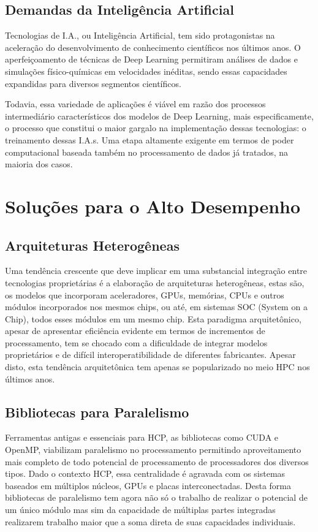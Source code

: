 \documentclass{article}
\begin{document}
\subsection*{Demandas da Inteligência Artificial}
Tecnologias de I.A., ou Inteligência Artificial, tem sido protagonistas na aceleração do desenvolvimento de conhecimento científicos nos últimos anos. O aperfeiçoamento de técnicas de Deep Learning permitiram análises de dados e simulações físico-químicas em velocidades inéditas, sendo essas capacidades expandidas para diversos segmentos científicos.

Todavia, essa variedade de aplicações é viável em razão dos processos intermediário característicos dos modelos de Deep Learning, mais especificamente, o processo que constitui o maior gargalo na implementação dessas tecnologias: o treinamento dessas I.A.s. Uma etapa altamente exigente em termos de poder computacional baseada também no processamento de dados já tratados, na maioria dos casos. 

\section*{Soluções para o Alto Desempenho}
\subsection*{Arquiteturas Heterogêneas}
Uma tendência crescente que deve implicar em uma substancial integração entre tecnologias proprietárias é a elaboração de arquiteturas heterogêneas, estas são, os modelos que incorporam aceleradores, GPUs, memórias, CPUs e outros módulos incorporados nos mesmos chips, ou até, em sistemas SOC (System on a Chip), todos esses módulos em um mesmo chip. Esta paradigma arquitetônico, apesar de apresentar eficiência evidente em termos de incrementos de processamento, tem se chocado com a dificuldade de integrar modelos proprietários e de difícil interoperatibilidade de diferentes fabricantes. Apesar disto, esta tendência arquitetônica tem apenas se popularizado no meio HPC nos últimos anos.
\subsection*{Bibliotecas para Paralelismo}
Ferramentas antigas e essenciais para HCP, as bibliotecas como CUDA e OpenMP, viabilizam paralelismo no processamento permitindo aproveitamento mais completo de todo potencial de processamento de processadores dos diversos tipos. Dado o contexto HCP, essa centralidade é agravada com os sistemas baseados em múltiplos núcleos, GPUs e placas interconectadas. Desta forma bibliotecas de paralelismo tem agora não só o trabalho de realizar o potencial de um único módulo mas sim da capacidade de múltiplas partes integradas realizarem trabalho maior que a soma direta de suas capacidades individuais. 
\end{document}
